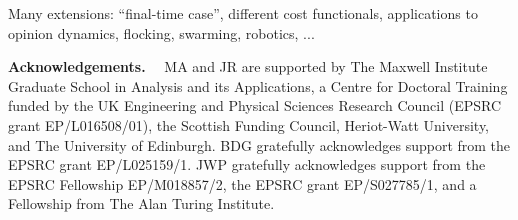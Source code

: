 \documentclass[final]{siamltex}
\begin{document}
Many extensions: ``final-time case'', different cost functionals, applications to opinion dynamics, flocking, swarming, robotics, ...


\vspace{0.75em}
\textbf{Acknowledgements.}~~
MA and JR are supported by The Maxwell Institute Graduate School in Analysis and
its Applications, a Centre for Doctoral Training funded by the UK Engineering and Physical Sciences
Research Council (EPSRC grant EP/L016508/01), the Scottish Funding Council, Heriot-Watt University, and
The University of Edinburgh.
%
BDG gratefully acknowledges support from the EPSRC grant EP/L025159/1.
%
JWP gratefully acknowledges support from the EPSRC Fellowship EP/M018857/2, the EPSRC grant EP/S027785/1, and a Fellowship from The Alan Turing Institute. 


\appendix







\end{document}
